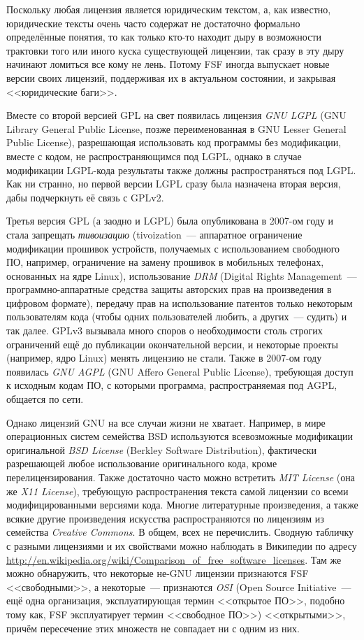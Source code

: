 Поскольку любая лицензия является юридическим текстом, а, как известно, юридические тексты очень часто содержат не достаточно формально определённые понятия, то как только кто-то находит дыру в возможности трактовки того или иного куска существующей лицензии, так сразу в эту дыру начинают ломиться все кому не лень.
Потому FSF иногда выпускает новые версии своих лицензий, поддерживая их в актуальном состоянии, и закрывая <<юридические баги>>.

Вместе со второй версией GPL на свет появилась лицензия \emph{GNU LGPL} (GNU Library General Public License, позже переименованная в GNU Lesser General Public License), разрешающая использовать код программы без модификации, вместе с кодом, не распространяющимся под LGPL, однако в случае модификации LGPL-кода результаты также должны распространяться под LGPL. Как ни странно, но первой версии LGPL сразу была назначена вторая версия, дабы подчеркнуть её связь с GPLv2.

Третья версия GPL (а заодно и LGPL) была опубликована в 2007-ом году и стала запрещать \emph{тивоизацию} (tivoization~--- аппаратное ограничение модификации прошивок устройств, получаемых с использованием свободного ПО, например, ограничение на замену прошивок в мобильных телефонах, основанных на ядре Linux), использование \emph{DRM} (Digital Rights Management~--- программно-аппаратные средства защиты авторских прав на произведения в цифровом формате), передачу прав на использование патентов только некоторым пользователям кода (чтобы одних пользователей любить, а других~--- судить) и так далее.
GPLv3 вызывала много споров о необходимости столь строгих ограничений ещё до публикации окончательной версии, и некоторые проекты (например, ядро Linux) менять лицензию не стали.
Также в 2007-ом году появилась \emph{GNU AGPL} (GNU Affero General Public License), требующая доступ к исходным кодам ПО, с которыми программа, распространяемая под AGPL, общается по сети.

Однако лицензий GNU на все случаи жизни не хватает.
Например, в мире операционных систем семейства BSD используются всевозможные модификации оригинальной \emph{BSD License} (Berkley Software Distribution), фактически разрешающей любое использование оригинального кода, кроме перелицензирования.
Также достаточно часто можно встретить \emph{MIT License} (она же \emph{X11 License}), требующую распространения текста самой лицензии со всеми модифицированными версиями кода.
Многие литературные произведения, а также всякие другие произведения искусства распространяются по лицензиям из семейства \emph{Creative Commons}.
В общем, всех не перечислить.
Сводную табличку с разными лицензиями и их свойствами можно наблюдать в Википедии по адресу \url{http://en.wikipedia.org/wiki/Comparison_of_free_software_licenses}.
Там же можно обнаружить, что некоторые не-GNU лицензии признаются FSF <<свободными>>, а некоторые~--- признаются \emph{OSI} (Open Source Initiative~--- ещё одна организация, эксплуатирующая термин <<открытое ПО>>, подобно тому как, FSF эксплуатирует термин <<свободное ПО>>) <<открытыми>>, причём пересечение этих множеств не совпадает ни с одним из них.

